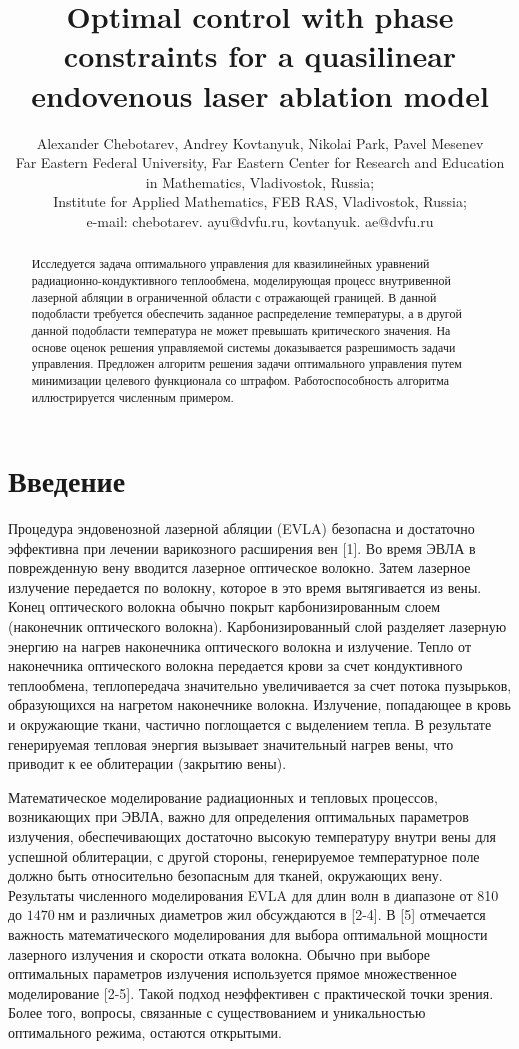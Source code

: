 \documentclass[10pt]{article}
\title{Optimal control with phase constraints for a quasilinear endovenous laser ablation model }
\author{Alexander Chebotarev, Andrey Kovtanyuk, Nikolai Park, Pavel Mesenev\\
Far Eastern Federal University, Far Eastern Center for Research and Education\\
in Mathematics, Vladivostok, Russia;\\
Institute for Applied Mathematics, FEB RAS, Vladivostok, Russia;\\
e-mail: chebotarev. ayu@dvfu.ru, kovtanyuk. ae@dvfu.ru}
\date{}
\begin{document}
\maketitle


\begin{abstract}
Исследуется задача оптимального управления для квазилинейных уравнений радиационно-кондуктивного
теплообмена, моделирующая процесс внутривенной лазерной
абляции в ограниченной области с отражающей границей.
В данной подобласти требуется обеспечить заданное
распределение температуры, а в другой
данной подобласти температура не может превышать критического значения.
На основе оценок решения управляемой системы
доказывается разрешимость задачи управления.
Предложен алгоритм
решения задачи оптимального управления путем минимизации целевого функционала со штрафом.
Работоспособность алгоритма иллюстрируется численным примером.
\end{abstract}

\section{Введение}
Процедура эндовенозной лазерной абляции (EVLA) безопасна и достаточно
эффективна при лечении варикозного расширения вен [1].
Во время ЭВЛА в поврежденную вену вводится лазерное оптическое волокно.
Затем лазерное излучение передается по волокну, которое в это время вытягивается из вены.
Конец оптического волокна обычно покрыт карбонизированным слоем (наконечник оптического волокна).
Карбонизированный слой разделяет лазерную энергию на нагрев наконечника оптического волокна и излучение.
Тепло от наконечника оптического волокна передается крови за счет кондуктивного теплообмена,
теплопередача значительно увеличивается за счет потока пузырьков,
образующихся на нагретом наконечнике волокна.
Излучение, попадающее в кровь и окружающие ткани, частично поглощается с выделением тепла.
В результате генерируемая тепловая энергия вызывает значительный нагрев вены,
что приводит к ее облитерации (закрытию вены).



Математическое моделирование радиационных и тепловых процессов, возникающих при ЭВЛА,
важно для определения оптимальных параметров излучения, обеспечивающих достаточно
высокую температуру внутри вены для успешной облитерации, с другой стороны,
генерируемое температурное поле должно быть относительно безопасным для тканей, окружающих вену.
Результаты численного моделирования EVLA для длин волн в диапазоне от
810 до $1470 \mathrm{~нм}$ и различных диаметров жил обсуждаются в [2-4].
В [5] отмечается важность математического моделирования для выбора оптимальной
мощности лазерного излучения и скорости отката волокна.
Обычно при выборе оптимальных параметров излучения
используется прямое множественное моделирование [2-5].
Такой подход неэффективен с практической точки зрения.
Более того, вопросы, связанные с существованием и
уникальностью оптимального режима, остаются открытыми.
\end{document}
